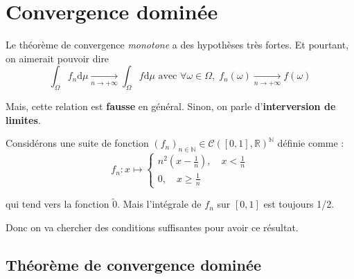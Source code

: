 







\newpage
\section{Convergence dominée} %
\label{sec:Convergence dominée}

Le théorème de convergence \textit{monotone} a des hypothèses très fortes. Et pourtant, on aimerait pouvoir dire 
\begin{equation}
  \boxed{ \int_{\Omega}^{} f_n \mathrm{d}\mu  \underset{n \to +\infty}{\longrightarrow} \int_{\Omega}^{} f \mathrm{d}\mu \text{ avec } \forall \omega \in \Omega, \; f_n(\omega)  \underset{n \to +\infty}{\longrightarrow} f(\omega)
}
 \end{equation}

Mais, cette relation est \textbf{fausse} en général. Sinon, on parle d'\textbf{interversion de limites}.

\begin{Example}{}{}
  Considérons une suite de fonction $(f_n) _{n \in \mathbb{N}} \in \mathscr{C}([0,1] , \mathbb{R}) ^{\mathbb{N}}$ définie comme : 
\begin{equation}
 f_n : x \mapsto \begin{cases}
  n ^{2} \left( x - \frac{1}{n}  \right), \quad x < \frac{1}{n}  \\ 
  0, \quad x \ge \frac{1}{n} 
 \end{cases} 
\end{equation}

qui tend vers la fonction $\widetilde{0}$. Mais l'intégrale de $f_n$ sur $[0,1]$ est toujours 1/2.
\end{Example}









Donc on va chercher des conditions suffisantes pour avoir ce résultat.



\subsection{Théorème de convergence dominée} %

